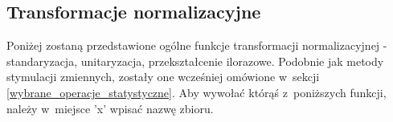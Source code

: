 \documentclass[12pt,a4paper]{report}
\begin{document}
\subsection{Transformacje normalizacyjne}
Poniżej zostaną przedstawione ogólne funkcje transformacji normalizacyjnej - standaryzacja, unitaryzacja, przekształcenie ilorazowe. Podobnie jak metody stymulacji zmiennych, zostały one wcześniej omówione w~sekcji \ref{wybrane_operacje_statystyczne}. Aby wywołać którąś z~poniższych funkcji, należy w~miejsce 'x' wpisać nazwę zbioru.

{
\newcommand{\VerbBar}{|}
\newcommand{\VERB}{\Verb[commandchars=\\\{\}]}

\newenvironment{Shaded}{\begin{snugshade}}{\end{snugshade}}
\newcommand{\KeywordTok}[1]{\textcolor[rgb]{0.13,0.29,0.53}{\textbf{{#1}}}}
\newcommand{\DataTypeTok}[1]{\textcolor[rgb]{0.13,0.29,0.53}{{#1}}}
\newcommand{\DecValTok}[1]{\textcolor[rgb]{0.00,0.00,0.81}{{#1}}}
\newcommand{\BaseNTok}[1]{\textcolor[rgb]{0.00,0.00,0.81}{{#1}}}
\newcommand{\FloatTok}[1]{\textcolor[rgb]{0.00,0.00,0.81}{{#1}}}
\newcommand{\ConstantTok}[1]{\textcolor[rgb]{0.00,0.00,0.00}{{#1}}}
\newcommand{\CharTok}[1]{\textcolor[rgb]{0.31,0.60,0.02}{{#1}}}
\newcommand{\SpecialCharTok}[1]{\textcolor[rgb]{0.00,0.00,0.00}{{#1}}}
\newcommand{\StringTok}[1]{\textcolor[rgb]{0.31,0.60,0.02}{{#1}}}
\newcommand{\VerbatimStringTok}[1]{\textcolor[rgb]{0.31,0.60,0.02}{{#1}}}
\newcommand{\SpecialStringTok}[1]{\textcolor[rgb]{0.31,0.60,0.02}{{#1}}}
\newcommand{\ImportTok}[1]{{#1}}
\newcommand{\CommentTok}[1]{\textcolor[rgb]{0.56,0.35,0.01}{\textit{{#1}}}}
\newcommand{\DocumentationTok}[1]{\textcolor[rgb]{0.56,0.35,0.01}{\textbf{\textit{{#1}}}}}
\newcommand{\AnnotationTok}[1]{\textcolor[rgb]{0.56,0.35,0.01}{\textbf{\textit{{#1}}}}}
\newcommand{\CommentVarTok}[1]{\textcolor[rgb]{0.56,0.35,0.01}{\textbf{\textit{{#1}}}}}
\newcommand{\OtherTok}[1]{\textcolor[rgb]{0.56,0.35,0.01}{{#1}}}
\newcommand{\FunctionTok}[1]{\textcolor[rgb]{0.00,0.00,0.00}{{#1}}}
\newcommand{\VariableTok}[1]{\textcolor[rgb]{0.00,0.00,0.00}{{#1}}}
\newcommand{\ControlFlowTok}[1]{\textcolor[rgb]{0.13,0.29,0.53}{\textbf{{#1}}}}
\newcommand{\OperatorTok}[1]{\textcolor[rgb]{0.81,0.36,0.00}{\textbf{{#1}}}}
\newcommand{\BuiltInTok}[1]{{#1}}
\newcommand{\ExtensionTok}[1]{{#1}}
\newcommand{\PreprocessorTok}[1]{\textcolor[rgb]{0.56,0.35,0.01}{\textit{{#1}}}}
\newcommand{\AttributeTok}[1]{\textcolor[rgb]{0.77,0.63,0.00}{{#1}}}
\newcommand{\RegionMarkerTok}[1]{{#1}}
\newcommand{\InformationTok}[1]{\textcolor[rgb]{0.56,0.35,0.01}{\textbf{\textit{{#1}}}}}
\newcommand{\WarningTok}[1]{\textcolor[rgb]{0.56,0.35,0.01}{\textbf{\textit{{#1}}}}}
\newcommand{\AlertTok}[1]{\textcolor[rgb]{0.94,0.16,0.16}{{#1}}}
\newcommand{\ErrorTok}[1]{\textcolor[rgb]{0.64,0.00,0.00}{\textbf{{#1}}}}
\newcommand{\NormalTok}[1]{{#1}}



}
\end{document}
